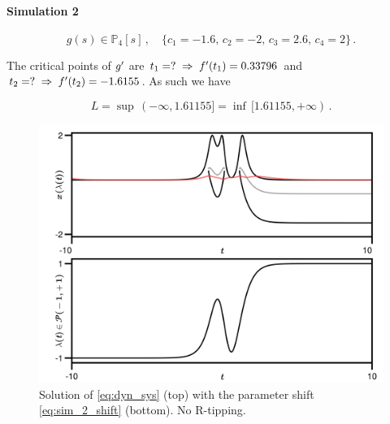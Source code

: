 \documentclass[../main.tex]{subfiles}
\begin{document}
\paragraph{Simulation 2}\label{par:sim_2}

\begin{equation}\label{eq:sim_2_shift}
        g(s) \in \mathbb{P}_{4}[s]\,,\quad\{c_{1}=-1.6,\, c_{2}=-2,\, c_{3}=2.6,\, c_{4}=2\}\,.
\end{equation}

The critical points of $g'$ are $t_{1} = ? \;\Rightarrow\;f'(t_{1}) = 0.33796$ and $t_{2} = ? \;\Rightarrow\;f'(t_{2}) = -1.6155$.
As such we have

\begin{equation*}
        L = \sup\,(-\infty,1.61155] = \inf\,[1.61155,+\infty)\,.
\end{equation*}

\begin{figure}[H]
    \centering 
    \includegraphics[keepaspectratio, width=\textwidth]{../figures/sim_2.png}
    \caption{Solution of \eqref{eq:dyn_sys} (top) with the parameter shift \eqref{eq:sim_2_shift} (bottom). No R-tipping.}
    \label{fig:sim_2}
\end{figure}
\end{document}
